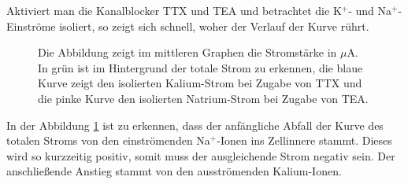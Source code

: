 \documentclass[11pt]{article}
\begin{document}
Aktiviert man die Kanalblocker TTX und TEA und betrachtet die K$^+$- und Na$^+$-Einströme isoliert, so zeigt sich schnell, woher der Verlauf der Kurve rührt.  
\begin{figure}[H]
\caption{Die Abbildung zeigt im mittleren Graphen die Stromstärke in $\mu$A. In grün ist im Hintergrund der totale Strom zu erkennen, die blaue Kurve zeigt den isolierten Kalium-Strom bei Zugabe von TTX und die pinke Kurve den isolierten Natrium-Strom bei Zugabe von TEA.}
\label{graph_all}
\end{figure}

In der Abbildung \ref{graph_all} ist zu erkennen, dass der anfängliche Abfall der Kurve des totalen Stroms von den einströmenden Na$^+$-Ionen ins Zellinnere stammt. Dieses wird so kurzzeitig positiv, somit muss der ausgleichende Strom negativ sein. Der anschließende Anstieg stammt von den ausströmenden Kalium-Ionen.
\end{document}
